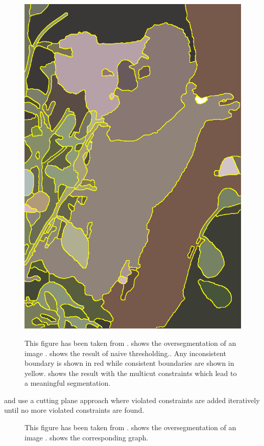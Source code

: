 \begin{figure}
{{        \protect\includegraphics[width=.075\linewidth]{fig/andres/2.png} 
    }%
}%
\caption[Naive thresholding vs. multicuts]{
This figure has been taken from \cite{andres_2011_iccv} .
 shows the oversegmentation of 
an image .
 shows the result of naive thresholding..
Any inconsistent boundary is shown in red while consistent
boundaries are shown in yellow. 
 shows the result with the multicut
constraints which lead to a meaningful segmentation.
} \label{fig:naive_thresholding}
\end{figure}


\citet{andres_2011_iccv} and \citet{kappes_2011_emmcvpr} use a
cutting plane approach where violated constraints are added
iteratively until no more violated constraints are found.


\begin{figure}
\centering
{}
%
\caption[Violated multicut constraints]{
This figure has been taken from \cite{andres_2011_iccv} .
 shows the oversegmentation of 
an image .
 shows the corresponding graph.
} \label{fig:mc_ineq}
\end{figure}




